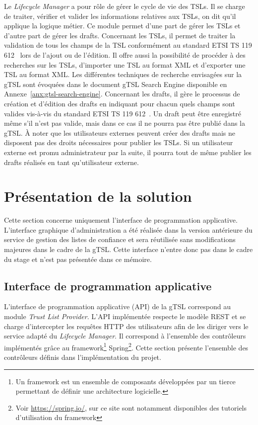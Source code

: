 \documentclass{tnreport}
\begin{document}
Le \textit{Lifecycle Manager} a pour rôle de gérer le cycle de vie des TSLs. Il se charge de traiter, vérifier et valider les informations relatives aux TSLs, on dit qu'il applique la logique métier. Ce module permet d'une part de gérer les TSLs et d'autre part de gérer les drafts. Concernant les TSLs, il permet de traiter la validation de tous les champs de la TSL conformément au standard ETSI TS 119 612~\cite{ETSITS119612} lors de l'ajout ou de l'édition. Il offre aussi la possibilité de procéder à des recherches sur les TSLs, d'importer une TSL au format XML et d'exporter une TSL au format XML. Les différentes techniques de recherche envisagées sur la gTSL sont évoquées dans le document gTSL Search Engine disponible en Annexe~\ref{anx:gtsl-search-engine}. Concernant les drafts, il gère le processus de création et d'édition des drafts en indiquant pour chacun quels champs sont valides vis-à-vis du standard ETSI TS 119 612~\cite{ETSITS119612}. Un draft peut être enregistré même s'il n'est pas valide, mais dans ce cas il ne pourra pas être publié dans la gTSL. À noter que les utilisateurs externes peuvent créer des drafts mais ne disposent pas des droits nécessaires pour publier les TSLs. Si un utilisateur externe est promu administrateur par la suite, il pourra tout de même publier les drafts réalisés en tant qu'utilisateur externe.

\section{Présentation de la solution}

Cette section concerne uniquement l'interface de programmation applicative. L'interface graphique d'administration a été réalisée dans la version antérieure du service de gestion des listes de confiance et sera réutilisée sans modifications majeures dans le cadre de la gTSL. Cette interface n'entre donc pas dans le cadre du stage et n'est pas présentée dans ce mémoire.

\subsection{Interface de programmation applicative}

L'interface de programmation applicative (API) de la gTSL correspond au module \textit{Trust List Provider}. L'API implémentée respecte le modèle REST et se charge d'intercepter les requêtes HTTP des utilisateurs afin de les diriger vers le service adapté du \textit{Lifecycle Manager}. Il correspond à l'ensemble des contrôleurs implémentés grâce au framework\footnote{Un framework est un ensemble de composants développées par un tierce permettant de définir une architecture logicielle.} Spring\footnote{Voir \url{https://spring.io/}, sur ce site sont notamment disponibles des tutoriels d'utilisation du framework}. Cette section présente l'ensemble des contrôleurs définis dans l'implémentation du projet.
\end{document}
